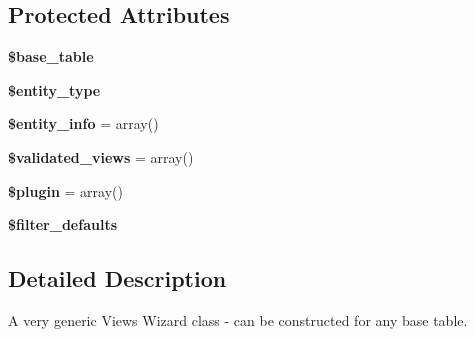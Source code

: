 \subsection*{Protected Attributes}
\begin{DoxyCompactItemize}
\item 
\hypertarget{classViewsUiBaseViewsWizard_ac581935d8c39b30a6af67b5b3f125f1d}{
{\bfseries \$base\_\-table}}
\label{classViewsUiBaseViewsWizard_ac581935d8c39b30a6af67b5b3f125f1d}

\item 
\hypertarget{classViewsUiBaseViewsWizard_a2f960e2efe31800f79883aa86e5e3935}{
{\bfseries \$entity\_\-type}}
\label{classViewsUiBaseViewsWizard_a2f960e2efe31800f79883aa86e5e3935}

\item 
\hypertarget{classViewsUiBaseViewsWizard_af3667e36b47152f3e5b01821fb0171ed}{
{\bfseries \$entity\_\-info} = array()}
\label{classViewsUiBaseViewsWizard_af3667e36b47152f3e5b01821fb0171ed}

\item 
\hypertarget{classViewsUiBaseViewsWizard_a64803ec24e2ccc3329b024352df240fc}{
{\bfseries \$validated\_\-views} = array()}
\label{classViewsUiBaseViewsWizard_a64803ec24e2ccc3329b024352df240fc}

\item 
\hypertarget{classViewsUiBaseViewsWizard_a68ffc2ba4daefe90daa35b4d3cb57d41}{
{\bfseries \$plugin} = array()}
\label{classViewsUiBaseViewsWizard_a68ffc2ba4daefe90daa35b4d3cb57d41}

\item 
{\bfseries \$filter\_\-defaults}
\end{DoxyCompactItemize}


\subsection{Detailed Description}
A very generic Views Wizard class -\/ can be constructed for any base table. 

